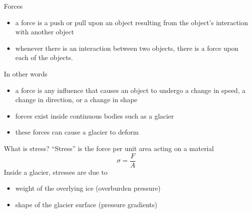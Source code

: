 \documentclass[hide notes,intlimits,unknownkeysallowed]{beamer}
\begin{document}
\begin{frame}{Forces}
  \begin{itemize}
  \item a force is a push or pull upon an object resulting from the object's interaction with another object
  \item whenever there is an interaction between two objects, there is a force upon each of the objects. 
  \end{itemize}
  In other words
  \begin{itemize}
  \item a force is any influence that causes an object to undergo a change in speed, a change in direction, or a change in shape
  \item forces exist inside continuous bodies such as a glacier
  \item these forces can cause a glacier to deform
  \end{itemize}
\end{frame}

\begin{frame}{What is stress?}
  ``Stress'' is the force per unit area acting on a material
  \begin{displaymath}
    \sigma = \frac{F}{A}
  \end{displaymath}
  Inside a glacier, stresses are due to
  \begin{itemize}
  \item weight of the overlying ice (overburden pressure)
  \item shape of the glacier surface (pressure gradients)
  \end{itemize}
\end{frame}
\end{document}
